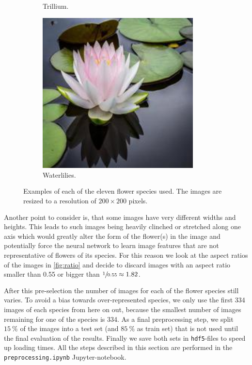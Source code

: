 \begin{figure}
\begin{subfigure}{0.24\textwidth}
        \caption{Trillium.}
    \end{subfigure}
    \begin{subfigure}{0.24\textwidth}
        \centering
        \includegraphics[width=0.9\textwidth]{../example_images/Waterlilies.jpg}
        \caption{Waterlilies.}
    \end{subfigure}
    \caption{Examples of each of the eleven flower species used. The images are resized to a resolution of $200\times200$ pixels.}
    \label{fig:images}
\end{figure}

Another point to consider is, that some images have very different widths and heights.
This leads to such images being heavily clinched or stretched along one axis which would greatly alter the form of the flower(s) in the image and potentially force the neural network 
to learn image features that are not representative of flowers of its species.
For this reason we look at the aspect ratios of the images in \autoref{fig:ratio} and decide to discard images with an aspect ratio smaller than 0.55 or bigger than $\sfrac{1}{0.55} \approx 1.82$. 

After this pre-selection the number of images for each of the flower species still varies.
To avoid a bias towards over-represented species, we only use the first 334 images of each species from here on out, because the smallest number of images remaining for one of the species is 334.
As a final preprocessing step, we split $\SI{15}{\percent}$ of the images into a test set (and $\SI{85}{\percent}$ as train set) that is not used until the final evaluation of the results.
Finally we save both sets in \texttt{hdf5}-files to speed up loading times.
All the steps described in this section are performed in the \texttt{preprocessing.ipynb} Jupyter-notebook.